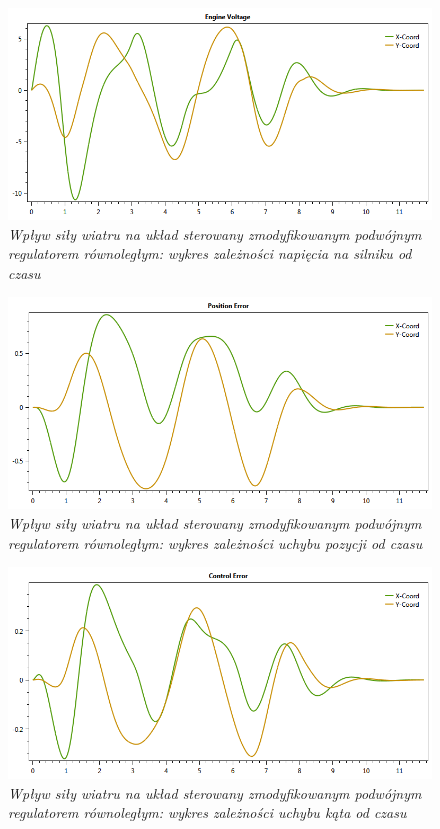 \documentclass[12pt, twoside, openany]{report}
\theoremstyle{definition}
\begin{document}
\begin{figure}[H]
	\centering
		\includegraphics[width = 350pt]{WindPDEV} 
		\caption{\textit{Wpływ siły wiatru na układ sterowany zmodyfikowanym podwójnym regulatorem równoległym: wykres zależności napięcia na silniku od czasu}}
		\label{plot:WindPDEV}
\end{figure}

\begin{figure}[H]
	\centering
		\includegraphics[width = 350pt]{WindPDCEP} 
		\caption{\textit{Wpływ siły wiatru na układ sterowany zmodyfikowanym podwójnym regulatorem równoległym: wykres zależności uchybu pozycji od czasu}}
		\label{plot:WindPDCEP}
\end{figure}

\begin{figure}[H]
	\centering
		\includegraphics[width = 350pt]{WindPDCEA} 
		\caption{\textit{Wpływ siły wiatru na układ sterowany zmodyfikowanym podwójnym regulatorem równoległym: wykres zależności uchybu kąta od czasu}}
		\label{plot:WindPDCEA}
\end{figure}
\end{document}
